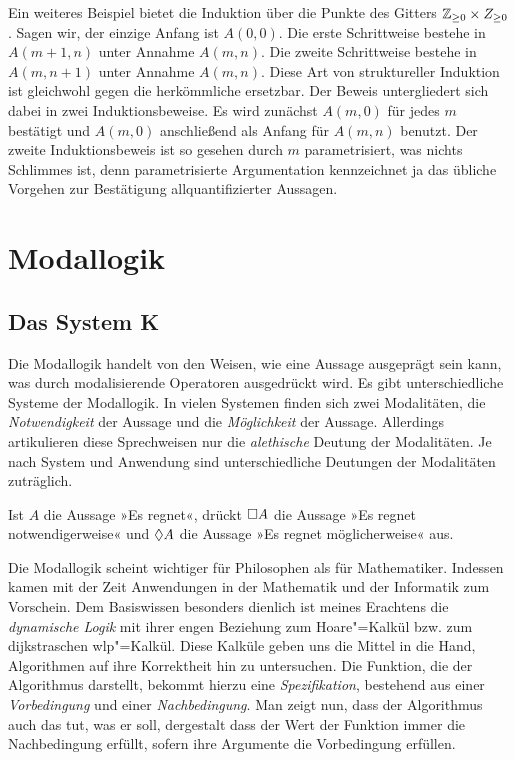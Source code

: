 Ein weiteres Beispiel bietet die Induktion über die Punkte des
Gitters $\mathbb Z_{\ge 0}\times Z_{\ge 0}$. Sagen wir, der einzige
Anfang ist $A(0,0)$. Die erste Schrittweise bestehe in $A(m+1,n)$
unter Annahme $A(m,n)$. Die zweite Schrittweise bestehe in $A(m,n+1)$
unter Annahme $A(m,n)$. Diese Art von struktureller Induktion ist
gleichwohl gegen die herkömmliche ersetzbar. Der Beweis untergliedert
sich dabei in zwei Induktionsbeweise. Es wird zunächst
$A(m,0)$ für jedes $m$ bestätigt und $A(m,0)$ anschließend als
Anfang für $A(m,n)$ benutzt. Der zweite Induktionsbeweis ist so gesehen
durch $m$ parametrisiert, was nichts Schlimmes ist, denn
parametrisierte Argumentation kennzeichnet ja das übliche Vorgehen
zur Bestätigung allquantifizierter Aussagen.

\newpage
\section{Modallogik}\label{sec:Modallogik}

\subsection{Das System K}

Die Modallogik handelt von den Weisen, wie eine Aussage ausgeprägt sein
kann, was durch modalisierende Operatoren ausgedrückt wird. Es gibt
unterschiedliche Systeme der Modallogik. In vielen Systemen finden sich
zwei Modalitäten, die \emph{Notwendigkeit} der Aussage und die
\emph{Möglichkeit} der Aussage. Allerdings artikulieren diese Sprechweisen
nur die \emph{alethische} Deutung der Modalitäten. Je nach System und
Anwendung sind unterschiedliche Deutungen der Modalitäten zuträglich.

Ist $A$ die Aussage »Es regnet«, drückt $\Box A$ die Aussage
»Es regnet notwendigerweise« und $\Diamond A$ die Aussage
»Es regnet möglicherweise« aus.

Die Modallogik scheint wichtiger für Philosophen als für
Mathematiker. Indessen kamen mit der Zeit Anwendungen in der
Mathematik und der Informatik zum Vorschein. Dem Basiswissen besonders
dienlich ist meines Erachtens die \emph{dynamische Logik} mit
ihrer engen Beziehung zum Hoare"=Kalkül bzw. zum dijkstraschen wlp"=Kalkül.
Diese Kalküle geben uns die Mittel in die Hand, Algorithmen auf ihre Korrektheit
hin zu untersuchen. Die Funktion, die der Algorithmus darstellt, bekommt
hierzu eine \emph{Spezifikation}, bestehend aus einer \emph{Vorbedingung}
und einer \emph{Nachbedingung}. Man zeigt nun, dass der Algorithmus auch
das tut, was er soll, dergestalt dass der Wert der Funktion immer die
Nachbedingung erfüllt, sofern ihre Argumente die Vorbedingung erfüllen.

